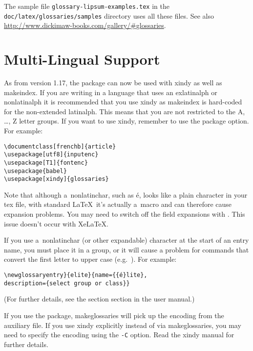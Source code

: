 \documentclass[report,inlinetitle,widecs]{nlctdoc}
\providecommand{\XeLaTeX}{XeLaTeX}
\newcommand*{\xdyopt}[1]{\texttt{-#1}\index{xindy=\appfmt{xindy}>#1=\texttt{-#1}|hyperpage}}
\newcounter{sample}
\begin{document}
The sample file \texttt{glossary-lipsum-examples.tex} in the 
\texttt{doc\slash latex\slash glossaries\slash samples} directory
uses all these files. See also
\url{http://www.dickimaw-books.com/gallery/#glossaries}.

\section{Multi-Lingual Support}
\label{sec:languages}

As from version 1.17, the  package can now be
used with \gls{xindy} as well as \gls{makeindex}. If you
are writing in a language that uses an \gls{exlatinalph} or
\gls{nonlatinalph} it is recommended that you use \gls*{xindy}
as \gls*{makeindex} is hard-coded for the non-extended
\gls{latinalph}. This
means that you are not restricted to the A, \ldots, Z letter groups.
If you want to use \gls*{xindy}, remember to use the
 package option. For example:
\begin{verbatim}
\documentclass[frenchb]{article}
\usepackage[utf8]{inputenc}
\usepackage[T1]{fontenc}
\usepackage{babel}
\usepackage[xindy]{glossaries}
\end{verbatim}

\begin{important}
Note that although a~\gls{nonlatinchar}, such as \'e, looks like a plain
character in your tex file, with standard \LaTeX\ it's actually a~macro and can therefore
cause expansion problems. You may need to switch off the field
expansions with . This issue doesn't occur
with \XeLaTeX.

If you use a~\gls{nonlatinchar} (or other expandable) character at the start of
an entry name, you must place it in a group, or it will cause
a problem for commands that convert the first letter to upper case
(e.g.\ ). For example:
\begin{alltt}
\verb|\newglossaryentry}{elite}{name={{|\'e\verb|}lite},|
description=\verb|{select group or class}}|
\end{alltt}
\end{important}
(For further details, see the section
 section in the  user manual.)

If you use the  package, \gls{makeglossaries}
will pick up the encoding from the auxiliary file. If you use
\gls{xindy} explicitly instead of via \gls*{makeglossaries},
you may need to specify the encoding using the \xdyopt{C} 
option. Read the \gls*{xindy} manual for further details.
\end{document}
